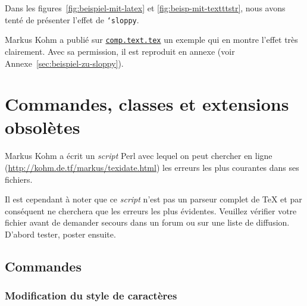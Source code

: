 \documentclass[fontsize=11pt, paper=a4, pagesize, captions=tableheading, numbers=enddot, toc=graduated, footnotes=multiple]{scrartcl}%
\newcommand{\News}[1]{\href{news:#1}{\texttt{#1}}}
\newcommand{\News}[1]{\href{news:#1}{\texttt{#1}}}
\DeclareRobustCommand*{\Macro}[1]{\mbox{\texttt{\char`\\#1}}}
\begin{document}
Dans les figures~\ref{fig:beispiel-mit-latex} et \vref{fig:beisp-mit-textttstr}, nous avons tenté de présenter l'effet de \Macro{sloppy}.

Markus Kohm a publié sur \News{comp.text.tex} un exemple qui en montre l'effet très clairement. Avec sa permission, il est reproduit en annexe (voir Annexe~\vref{sec:beispiel-zu-sloppy}).

\clearpage
\section{Commandes, classes et extensions obsolètes}
\label{sec:obsoletes}

Markus Kohm a écrit un \emph{script} Perl avec lequel on peut chercher en ligne (\url{http://kohm.de.tf/markus/texidate.html}) les erreurs les plus courantes dans ses fichiers.

Il est cependant à noter que ce \emph{script} n'est pas un parseur complet de \TeX{} et par conséquent ne cherchera que les erreurs les plus évidentes. Veuillez vérifier votre fichier avant de demander secours dans un forum ou sur une liste de diffusion. D’abord tester, poster ensuite.
\subsection{Commandes}
\label{sec:befehle}

\subsubsection{Modification du style de caractères}
\label{sec:ander-des-schr}
\end{document}
